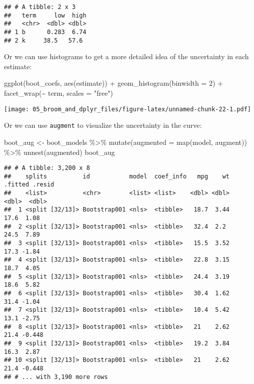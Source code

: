 \documentclass[
]{book}
\newenvironment{Shaded}{\begin{snugshade}}{\end{snugshade}}
\newcommand{\AttributeTok}[1]{\textcolor[rgb]{0.77,0.63,0.00}{#1}}
\newcommand{\DecValTok}[1]{\textcolor[rgb]{0.00,0.00,0.81}{#1}}
\newcommand{\FunctionTok}[1]{\textcolor[rgb]{0.00,0.00,0.00}{#1}}
\newcommand{\NormalTok}[1]{#1}
\newcommand{\OtherTok}[1]{\textcolor[rgb]{0.56,0.35,0.01}{#1}}
\newcommand{\SpecialCharTok}[1]{\textcolor[rgb]{0.00,0.00,0.00}{#1}}
\newcommand{\StringTok}[1]{\textcolor[rgb]{0.31,0.60,0.02}{#1}}
\begin{document}
\begin{verbatim}
## # A tibble: 2 x 3
##   term     low  high
##   <chr>  <dbl> <dbl>
## 1 b      0.283  6.74
## 2 k     38.5   57.6
\end{verbatim}

Or we can use histograms to get a more detailed idea of the uncertainty in each estimate:

\begin{Shaded}
\begin{Highlighting}[]
\FunctionTok{ggplot}\NormalTok{(boot\_coefs, }\FunctionTok{aes}\NormalTok{(estimate)) }\SpecialCharTok{+} 
    \FunctionTok{geom\_histogram}\NormalTok{(}\AttributeTok{binwidth =} \DecValTok{2}\NormalTok{) }\SpecialCharTok{+} 
    \FunctionTok{facet\_wrap}\NormalTok{(}\SpecialCharTok{\textasciitilde{}}\NormalTok{ term, }\AttributeTok{scales =} \StringTok{"free"}\NormalTok{)}
\end{Highlighting}
\end{Shaded}

\texttt{[image: 05\_broom\_and\_dplyr\_files/figure-latex/unnamed-chunk-22-1.pdf]}

Or we can use \texttt{augment} to visualize the uncertainty in the curve:

\begin{Shaded}
\begin{Highlighting}[]
\NormalTok{boot\_aug }\OtherTok{\textless{}{-}}\NormalTok{ boot\_models }\SpecialCharTok{\%\textgreater{}\%} 
    \FunctionTok{mutate}\NormalTok{(}\AttributeTok{augmented =} \FunctionTok{map}\NormalTok{(model, augment)) }\SpecialCharTok{\%\textgreater{}\%} 
    \FunctionTok{unnest}\NormalTok{(augmented)}
\NormalTok{boot\_aug}
\end{Highlighting}
\end{Shaded}

\begin{verbatim}
## # A tibble: 3,200 x 8
##    splits          id           model  coef_info   mpg    wt .fitted .resid
##    <list>          <chr>        <list> <list>    <dbl> <dbl>   <dbl>  <dbl>
##  1 <split [32/13]> Bootstrap001 <nls>  <tibble>   18.7  3.44    17.6  1.08 
##  2 <split [32/13]> Bootstrap001 <nls>  <tibble>   32.4  2.2     24.5  7.89 
##  3 <split [32/13]> Bootstrap001 <nls>  <tibble>   15.5  3.52    17.3 -1.84 
##  4 <split [32/13]> Bootstrap001 <nls>  <tibble>   22.8  3.15    18.7  4.05 
##  5 <split [32/13]> Bootstrap001 <nls>  <tibble>   24.4  3.19    18.6  5.82 
##  6 <split [32/13]> Bootstrap001 <nls>  <tibble>   30.4  1.62    31.4 -1.04 
##  7 <split [32/13]> Bootstrap001 <nls>  <tibble>   10.4  5.42    13.1 -2.75 
##  8 <split [32/13]> Bootstrap001 <nls>  <tibble>   21    2.62    21.4 -0.448
##  9 <split [32/13]> Bootstrap001 <nls>  <tibble>   19.2  3.84    16.3  2.87 
## 10 <split [32/13]> Bootstrap001 <nls>  <tibble>   21    2.62    21.4 -0.448
## # ... with 3,190 more rows
\end{verbatim}
\end{document}
